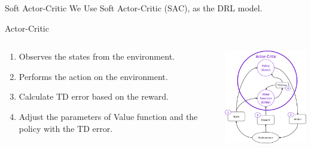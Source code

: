 \begin{frame}{Soft Actor-Critic}
We Use Soft Actor-Critic (SAC), as the DRL model.
\begin{block}{Actor-Critic}
     \begin{columns}
        \begin{column}{0.45\textwidth}
        \begin{enumerate}
            \item Observes the states from the environment.
            \item Performs the action on the environment.
            \item Calculate TD error based on the reward.
            \item Adjust the parameters of Value function and the policy with the TD error.
        \end{enumerate}
        \end{column}
        \begin{column}{0.45\textwidth}
        \centering
        \includegraphics[width=5cm]{images/actor_critic.png}
     \end{column}
     \end{columns}
 \end{block}
\end{frame}